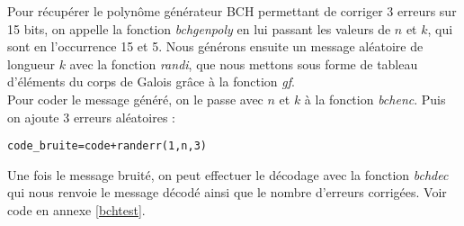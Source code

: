 \documentclass[a4paper, 12pt]{article}
\begin{document}
Pour récupérer le polynôme générateur BCH permettant de corriger 3 erreurs sur 15 bits, on appelle la fonction \textit{bchgenpoly} en lui passant les valeurs de $n$ et $k$, qui sont en l’occurrence 15 et 5. Nous générons ensuite un message aléatoire de longueur $k$ avec la fonction \textit{randi}, que nous mettons sous forme de tableau d’éléments du corps de Galois grâce à la fonction \textit{gf}. \\
Pour coder le message généré, on le passe avec $n$ et $k$ à la fonction \textit{bchenc}. Puis on ajoute 3 erreurs aléatoires :
\begin{alltt}
code_bruite = code + randerr(1,n,3)
\end{alltt}
Une fois le message bruité, on peut effectuer le décodage avec la fonction \textit{bchdec} qui nous renvoie le message décodé ainsi que le nombre d'erreurs corrigées.
Voir code en annexe \ref{bchtest}.







\end{document}
